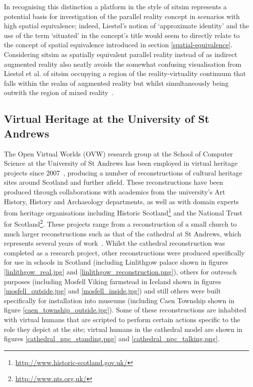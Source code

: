 In recognising this distinction a platform in the style of sitsim represents a potential basis for investigation of the parallel reality concept in scenarios with high spatial equivalence; indeed, Liest\o l's notion of `approximate identity' and the use of the term `situated' in the concept's title would seem to directly relate to the concept of spatial equivalence introduced in section \ref{spatial-equivalence}. Considering sitsim as spatially equivalent parallel reality instead of as indirect augmented reality also neatly avoids the somewhat confusing visualisation from Liest\o l et al. of sitsim occupying a region of the reality-virtuality continuum that falls within the realm of augmented reality but whilst simultaneously being outwith the region of mixed reality~\cite{Liestøl2011}.



\subsection{Virtual Heritage at the University of St Andrews}

\label{virtual-heritage-at-st-andrews}


The Open Virtual Worlds (OVW) research group at the School of Computer Science at the University of St Andrews has been employed in virtual heritage projects since 2007~\cite{Getchell2007}, producing a number of reconstructions of cultural heritage sites around Scotland and further afield. These reconstructions have been produced through collaborations with academics from the university's Art History, History and Archaeology departments, as well as with domain experts from heritage organisations including Historic Scotland\footnote{\url{http://www.historic-scotland.gov.uk/}} and the National Trust for Scotland\footnote{\url{http://www.nts.org.uk/}}. These projects range from a reconstruction of a small church to much larger reconstructions such as that of the cathedral at St Andrews, which represents several years of work~\cite{Kennedy2013}. Whilst the cathedral reconstruction was completed as a research project, other reconstructions were produced specifically for use in schools in Scotland (including Linlithgow palace shown in figures \ref{linlithgow_real.jpg} and \ref{linlithgow_reconstruction.png}), others for outreach purposes (including Mosfell Viking farmstead in Iceland shown in figures \ref{mosfell_outside.jpg} and \ref{mosfell_inside.jpg}) and still others were built specifically for installation into museums (including Caen Township shown in figure  \ref{caen_township_outside.jpg}). Some of these reconstructions are inhabited with virtual humans that are scripted to perform certain actions specific to the role they depict at the site; virtual humans in the cathedral model are shown in figures \ref{cathedral_npc_standing.png} and \ref{cathedral_npc_talking.png}.

